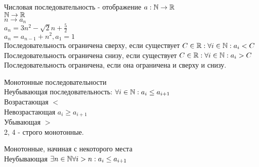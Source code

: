 


Числовая последовательность - отображение $ a: \mathbb{N} \rightarrow \mathbb{R} $ \\
$ \mathbb{N} \rightarrow \mathbb{R} $ \\
$ n \rightarrow a_n $ \\
$ a_n = 3n^2 - \sqrt{2} n+ \frac{5}{2} $ \\
$ a_n = a_{n-1} + n^2, a_1 = 1$\\

Последовательность ограничена сверху, если существует  $ C \in \mathbb{R} : \forall i \in \mathbb{N} : a_i < C $ \\
Последовательность ограничена снизу, если существует  $ C \in \mathbb{R} : \forall i \in \mathbb{N} : a_i > C $ \\
Последовательность ограничена, если она ограничена и сверху и снизу.

Монотонные последовательности \\
Неубывающая последовательность: $ \forall i \in \mathbb{N} : a_i \leq a_{i+1} $\\
Возрастающая $ < $ \\
Невозрастающая $ a_i \geq a_{i+1} $\\
Убывающая $ > $ \\
2, 4 - строго монотонные.

Монотонные, начиная с некоторого места \\
Неубывающая $ \exists n \in \mathbb{N} \forall i > n : a_i \leq a_{i+1} $\\


